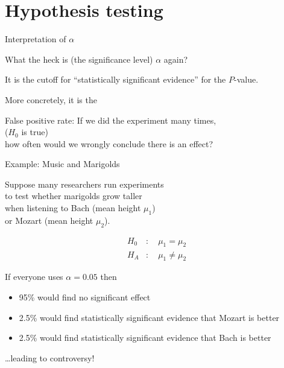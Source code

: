 \section{Hypothesis testing}

\begin{frame}{Interpretation of $\alpha$}

  What the heck is (the significance level) $\alpha$ again?

  \vspace{2em}
  \pause

  It is the \alert{cutoff} for ``statistically significant evidence''
  for the $P$-value.

    \vspace{2em}

    More concretely, it is the 
  \begin{block}{False positive rate:}
    If we did the experiment many times,\\
     ($H_0$ is true)\\
    how often would we \alert{wrongly} conclude there is an effect?
  \end{block}

\end{frame}



\begin{frame}{Example: Music and Marigolds}

    Suppose many researchers run experiments\\
    to test whether marigolds grow taller \\
    when listening to Bach (mean height $\mu_1$) \\
    or Mozart (mean height $\mu_2$). 


    \vspace{2em}

    \begin{align*}
        H_0 &: \quad \mu_1 = \mu_2  \\
        H_A &: \quad \mu_1 \neq \mu_2 
    \end{align*}

    \vspace{2em}

    If everyone uses $\alpha=0.05$ then
    \begin{itemize}
        \item 95\% would find no significant effect
        \item 2.5\% would find statistically significant evidence that Mozart is better
        \item 2.5\% would find statistically significant evidence that Bach is better
    \end{itemize}
    \ldots leading to \alert{controversy!}

\end{frame}


